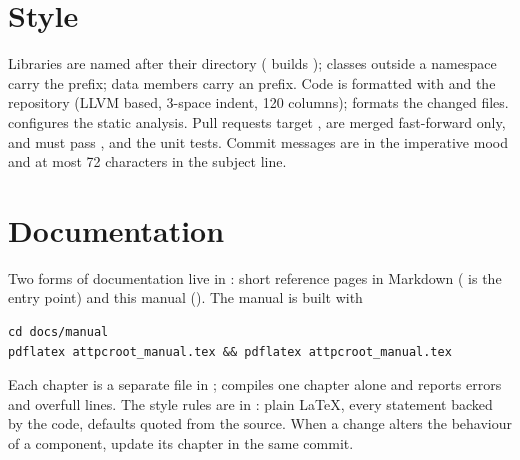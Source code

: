 \section{Style}

Libraries are named after their directory ( builds ); classes outside a namespace carry the
 prefix; data members carry an  prefix. Code is formatted with  and the
repository  (LLVM based, 3-space indent, 120 columns);  formats the
changed files.  configures the static analysis. Pull requests target , are merged
fast-forward only, and must pass ,  and the unit tests. Commit messages are in the
imperative mood and at most 72 characters in the subject line.

\section{Documentation}

Two forms of documentation live in : short reference pages in Markdown ( is the entry
point) and this manual (). The manual is built with
\begin{verbatim}
cd docs/manual
pdflatex attpcroot_manual.tex && pdflatex attpcroot_manual.tex
\end{verbatim}
Each chapter is a separate file in ;  compiles one chapter
alone and reports errors and overfull lines. The style rules are in : plain LaTeX, every
statement backed by the code, defaults quoted from the source. When a change alters the behaviour of a component,
update its chapter in the same commit.
